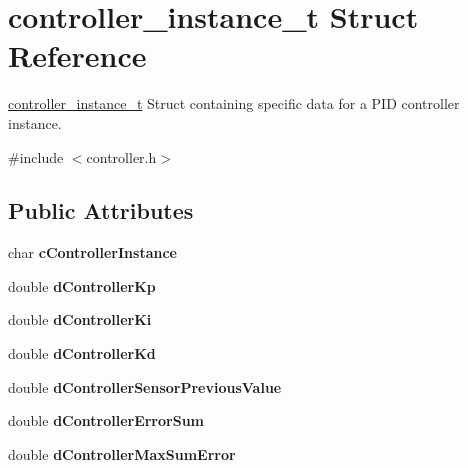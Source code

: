 \hypertarget{structcontroller__instance__t}{\section{controller\-\_\-instance\-\_\-t Struct Reference}
\label{structcontroller__instance__t}
}


\hyperlink{structcontroller__instance__t}{controller\-\_\-instance\-\_\-t} Struct containing specific data for a P\-I\-D controller instance.  




{\ttfamily \#include $<$controller.\-h$>$}

\subsection*{Public Attributes}
\begin{DoxyCompactItemize}
\item 
\hypertarget{structcontroller__instance__t_a542ee3f3788e7b8a76c27770ccf642e2}{char {\bfseries c\-Controller\-Instance}}\label{structcontroller__instance__t_a542ee3f3788e7b8a76c27770ccf642e2}

\item 
\hypertarget{structcontroller__instance__t_a31ffd97af3cfab4ac4c9732a77817e3f}{double {\bfseries d\-Controller\-Kp}}\label{structcontroller__instance__t_a31ffd97af3cfab4ac4c9732a77817e3f}

\item 
\hypertarget{structcontroller__instance__t_a0d402050e7c103a34c5b1e1fdb8d7b6a}{double {\bfseries d\-Controller\-Ki}}\label{structcontroller__instance__t_a0d402050e7c103a34c5b1e1fdb8d7b6a}

\item 
\hypertarget{structcontroller__instance__t_a8e2aa79eeec38d61c3d5166efcd3e695}{double {\bfseries d\-Controller\-Kd}}\label{structcontroller__instance__t_a8e2aa79eeec38d61c3d5166efcd3e695}

\item 
\hypertarget{structcontroller__instance__t_a95d2417c751791f4abd6791c87a298c1}{double {\bfseries d\-Controller\-Sensor\-Previous\-Value}}\label{structcontroller__instance__t_a95d2417c751791f4abd6791c87a298c1}

\item 
\hypertarget{structcontroller__instance__t_ae2b397d199c20d3fbd355dc98d044103}{double {\bfseries d\-Controller\-Error\-Sum}}\label{structcontroller__instance__t_ae2b397d199c20d3fbd355dc98d044103}

\item 
\hypertarget{structcontroller__instance__t_a8ca59901607351c2349c56c80ecd69a5}{double {\bfseries d\-Controller\-Max\-Sum\-Error}}\label{structcontroller__instance__t_a8ca59901607351c2349c56c80ecd69a5}

\end{DoxyCompactItemize}


